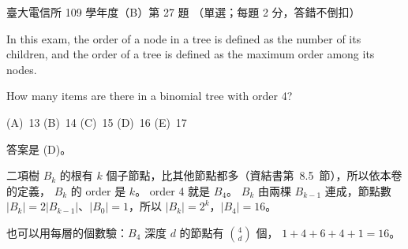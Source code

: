 \begin{pastexam}[label={px:ntu-109-comm-dsa-27}]{臺大電信所 109 學年度（B）第 27 題}
（單選；每題 2 分，答錯不倒扣）

In this exam, the order of a node in a tree is defined as the number of its children, and the order
of a tree is defined as the maximum order among its nodes.

How many items are there in a binomial tree with order 4?

(A)~13 \qquad (B)~14 \qquad (C)~15 \qquad (D)~16 \qquad (E)~17
\end{pastexam}

\begin{pastsoln}
答案是 (D)。

二項樹 $B_k$ 的根有 $k$ 個子節點，比其他節點都多（資結書第~8.5~節），所以依本卷的定義，
$B_k$ 的 order 是 $k$。 order 4 就是 $B_4$。 $B_k$ 由兩棵 $B_{k-1}$ 連成，節點數
$|B_k| = 2|B_{k-1}|$、$|B_0| = 1$，所以 $|B_k| = 2^k$，$|B_4| = 16$。

也可以用每層的個數驗：$B_4$ 深度 $d$ 的節點有 $\binom{4}{d}$ 個，
$1 + 4 + 6 + 4 + 1 = 16$。
\end{pastsoln}
